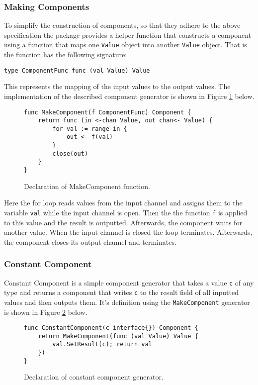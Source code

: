 \subsubsection{Making Components}
To simplify the construction of components, so that they adhere to 
the above specification the package provides a helper function that 
constructs a component using a function that maps one \texttt{Value} object 
into another \texttt{Value} object. 
That is the function has the following signature:
\begin{lstlisting}
type ComponentFunc func (val Value) Value
\end{lstlisting}
This represents the mapping of the input values to the output values. 
The implementation of the described component generator is shown in 
Figure \ref{fig:MakeComponent} below.
\begin{figure}[h]
\centering
\begin{lstlisting}
func MakeComponent(f ComponentFunc) Component {
    return func (in <-chan Value, out chan<- Value) {
        for val := range in {
            out <- f(val)
        }
        close(out)
    }
}
\end{lstlisting}
\caption[scale=1.0]{Declaration of MakeComponent function.}
\label{fig:MakeComponent}
\end{figure}

Here the for loop reads values from the input channel and assigns them
to the variable \texttt{val} while the input channel is open. Then the 
the function \texttt{f} is applied to this value and the result is outputted.
Afterwards, the component waits for another value. When the input channel
is closed the loop terminates. Afterwards, the component closes its output channel
and terminates.

\subsubsection{Constant Component}
Constant Component is a simple component generator that takes a value \texttt{c}
of any type and returns a component that writes \texttt{c} to the result field of 
all inputted values and then outputs them. It's definition using the 
\texttt{MakeComponent} generator is shown in Figure 
\ref{fig:ConstantComponent} below.
\begin{figure}[h]
\centering
\begin{lstlisting}
func ConstantComponent(c interface{}) Component {
    return MakeComponent(func (val Value) Value {
        val.SetResult(c); return val
    })
}
\end{lstlisting}
\caption[scale=1.0]{Declaration of constant component generator.}
\label{fig:ConstantComponent}
\end{figure}

